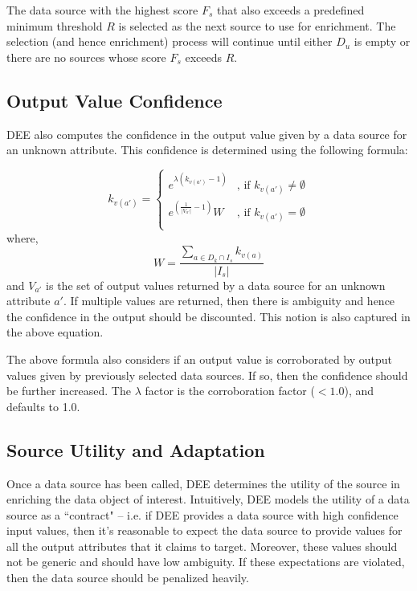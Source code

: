 \documentclass{article}
\begin{document}
The data source with the highest score $F_s$ that also exceeds a predefined minimum threshold $R$ is selected
as the next source to use for enrichment. The selection (and hence enrichment) process will continue until
either $D_u$ is empty or there are no sources whose score $F_s$ exceeds $R$.


\subsection{Output Value Confidence} 

DEE also computes the confidence in the output value given by a data source for an unknown attribute. 
This confidence is determined using the following formula: 

\begin{equation}
 \label{_output_confidence}
k_{v(a')} = \left\lbrace 
		\begin{array}{ll}
			e^{\lambda(k_{v(a')} - 1)} 						& \mbox{, if } k_{v(a')} \neq \emptyset \\
			e^{ \left( \frac{1}{|V_{a'}|} - 1 \right) } W \nonumber  	& \mbox{, if } k_{v(a')} = \emptyset \\
		\end{array}
		\right.
\end{equation}
where,  
\begin{equation}
	W = \frac{\displaystyle\sum\limits_{a \in D_k \cap I_s} k_{v(a)} }{|I_s|}
\end{equation}
and $V_{a'}$ is the set of output values returned by a data source for an unknown attribute $a'$. If 
multiple values are returned, then there is ambiguity and hence the confidence in the output should 
be discounted. This notion is also captured in the above equation.

The above formula also considers if an output value is corroborated by output values given by previously
selected data sources. If so, then the confidence should be further increased. The $\lambda$ factor is
the corroboration factor ($< 1.0$), and defaults to 1.0.


\subsection{Source Utility and Adaptation}

Once a data source has been called, DEE determines the utility of the source in enriching the data
object of interest. Intuitively, DEE models the utility of a data source as a ``contract" -- i.e. if 
DEE provides a data source with high confidence input values, then it's reasonable to expect the data
source to provide values for all the output attributes that it claims to target. Moreover, these values 
should not be generic and should have low ambiguity. If these expectations are violated, then the data 
source should be penalized heavily. 
\end{document}
